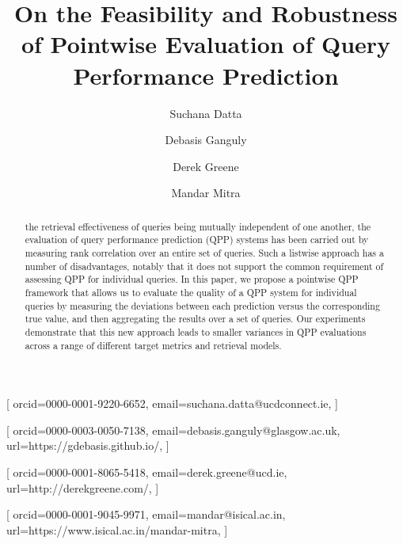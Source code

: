 \documentclass[]{ceurart}
\begin{document}


\title{On the Feasibility and Robustness of Pointwise Evaluation of Query Performance Prediction}

\author[1]{Suchana Datta}[%
orcid=0000-0001-9220-6652,
email=suchana.datta@ucdconnect.ie,
]

\author[2]{Debasis Ganguly}[%
orcid=0000-0003-0050-7138,
email=debasis.ganguly@glasgow.ac.uk,
url=https://gdebasis.github.io/,
]

\author[3]{Derek Greene}[%
orcid=0000-0001-8065-5418,
email=derek.greene@ucd.ie,
url=http://derekgreene.com/,
]

\author[4]{Mandar Mitra}[%
orcid=0000-0001-9045-9971,
email=mandar@isical.ac.in,
url=https://www.isical.ac.in/mandar-mitra,
]

\address[1]{University College Dublin, Ireland}
\address[2]{University of Glasgow, UK}
\address[3]{University College Dublin, Ireland}
\address[4]{Indian Statistical Institute, Kolkata, India}

\begin{abstract}
 the retrieval effectiveness of queries being mutually independent of one another, the evaluation of query performance prediction (QPP) systems has been carried out by measuring rank correlation over an entire set of queries. 
Such a listwise approach has a number of disadvantages, notably that it does not support the common requirement of assessing QPP for individual queries.
In this paper, we propose a pointwise QPP framework that allows us to evaluate the quality of a QPP system for individual queries by measuring the deviations between each prediction versus the corresponding true value, and then aggregating the results over a set of queries.
Our experiments demonstrate that this new approach leads to smaller variances in QPP evaluations across a range of different target metrics and retrieval models.
\end{abstract}

\maketitle
\end{document}
